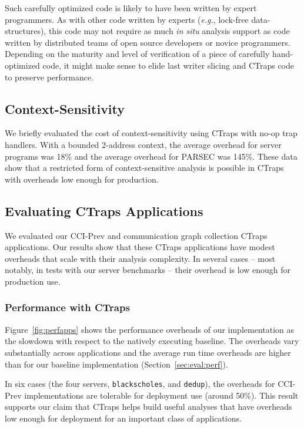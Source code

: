 \documentclass[preprint,9pt]{sigplanconf}
\newcommand{\ctraps}{CTraps\xspace}
\begin{document}
Such carefully optimized code is likely to have been written by expert
programmers.  As with other code written by experts ({\em e.g.}, lock-free
data-structures), this code may not require as much {\em in situ} analysis
support as code written by distributed teams of open source developers or
novice programmers.  Depending on the maturity and level of verification of a
piece of carefully hand-optimized code, it might make sense to elide 
last writer slicing and \ctraps code to preserve performance. 
 

\subsection{Context-Sensitivity}
We briefly evaluated the cost of context-sensitivity using \ctraps with no-op
trap handlers.  With a bounded 2-address context, the average overhead for
server programs was 18\% and the average overhead for PARSEC was 145\%.  These
data show that a restricted form of context-sensitive analysis is possible in
\ctraps with overheads low enough for production.  


\subsection{Evaluating CTraps Applications}
\label{sec:appperf}
We evaluated our CCI-Prev and communication graph collection CTraps
applications.  Our results show that these CTraps applications have modest
overheads that scale with their analysis complexity.  In several cases -- most
notably, in tests with our server benchmarks -- their overhead is low enough
for production use.  

\subsubsection{Performance with \ctraps}

 Figure~\ref{fig:perfapps} shows the performance overheads of
our implementation as the slowdown with respect to the natively executing
baseline.  The overheads vary substantially across applications and the average
run time overheads are higher than for our baseline implementation
(Section~\ref{sec:eval:perf}). 
  

In six cases (the four servers, {\tt blackscholes}, and {\tt dedup}), the overheads
for CCI-Prev implementations are tolerable for deployment use (around 50\%).
This result supports our claim that \ctraps helps build useful analyses that
have overheads low enough for deployment for an important class of
applications.  
\end{document}
